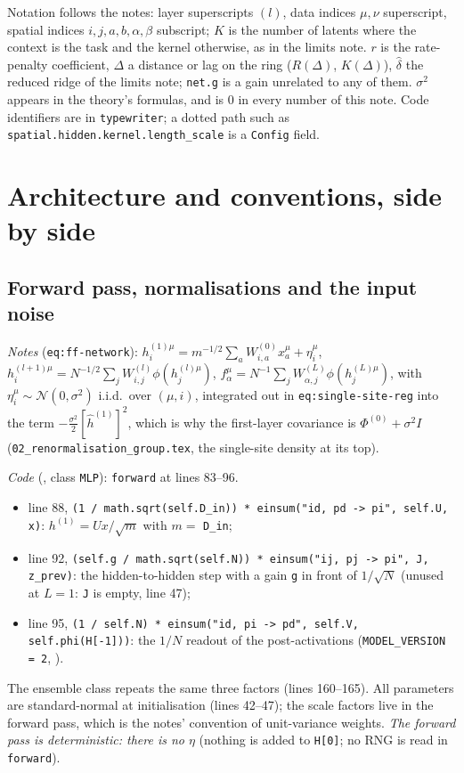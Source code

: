 \documentclass[11pt,a4paper]{article}
\newcommand{\code}[1]{\texttt{#1}}
\begin{document}
Notation follows the notes: layer superscripts $(l)$, data indices $\mu,\nu$ superscript, spatial indices $i,j,a,b,\alpha,\beta$ subscript; $K$ is the number of latents where the context is the task and the kernel otherwise, as in the limits note. $r$ is the rate-penalty coefficient, $\Delta$ a distance or lag on the ring ($R(\Delta)$, $K(\Delta)$), $\hat\delta$ the reduced ridge of the limits note; \code{net.g} is a gain unrelated to any of them. $\sigma^2$ appears in the theory's formulas, and is $0$ in every number of this note. Code identifiers are in \code{typewriter}; a dotted path such as \code{spatial.hidden.kernel.length\_scale} is a \code{Config} field.

\section{Architecture and conventions, side by side}
\label{sec:side}

\subsection{Forward pass, normalisations and the input noise}
\label{sec:forward}
\emph{Notes} (\code{eq:ff-network}): $h^{(1)\mu}_i = m^{-1/2}\sum_a W^{(0)}_{i,a}x^\mu_a + \eta^\mu_i$, $h^{(l+1)\mu}_i = N^{-1/2}\sum_j W^{(l)}_{i,j}\phi(h^{(l)\mu}_j)$, $f^\mu_\alpha = N^{-1}\sum_j W^{(L)}_{\alpha,j}\phi(h^{(L)\mu}_j)$, with $\eta^\mu_i\sim\mathcal N(0,\sigma^2)$ i.i.d.\ over $(\mu, i)$, integrated out in \code{eq:single-site-reg} into the term $-\frac{\sigma^2}2[\hat h^{(1)}]^2$, which is why the first-layer covariance is $\Phi^{(0)} + \sigma^2 I$ (\code{02\_renormalisation\_group.tex}, the single-site density at its top).

\emph{Code} (, class \code{MLP}): \code{forward} at lines 83--96.
\begin{itemize}[nosep]
  \item line 88, \code{(1 / math.sqrt(self.D\_in)) * einsum("id, pd -> pi", self.U, x)}: $h^{(1)} = Ux/\sqrt m$ with $m = $ \code{D\_in};
  \item line 92, \code{(self.g / math.sqrt(self.N)) * einsum("ij, pj -> pi", J, z\_prev)}: the hidden-to-hidden step with a gain \code{g} in front of $1/\sqrt N$ (unused at $L = 1$: \code{J} is empty, line 47);
  \item line 95, \code{(1 / self.N) * einsum("id, pi -> pd", self.V, self.phi(H[-1]))}: the $1/N$ readout of the post-activations (\code{MODEL\_VERSION = 2}, ).
\end{itemize} The ensemble class repeats the same three factors (lines 160--165). All parameters are standard-normal at initialisation (lines 42--47); the scale factors live in the forward pass, which is the notes' convention of unit-variance weights. \emph{The forward pass is deterministic: there is no $\eta$} (nothing is added to \code{H[0]}; no RNG is read in \code{forward}).
\end{document}
